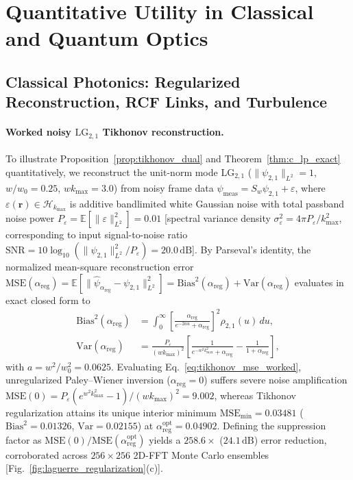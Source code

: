 \documentclass[aps,pra,reprint,amsmath,amssymb,floatfix,longbibliography]{revtex4-2}
\providecommand{\norm}[1]{\lVert#1\rVert}
\begin{document}
\section{Quantitative Utility in Classical and Quantum Optics}
\label{sec:optics_utility}

\subsection{Classical Photonics: Regularized Reconstruction, RCF Links, and Turbulence}
\label{subsec:classical_utility}

\paragraph*{Worked noisy $\mathrm{LG}_{2,1}$ Tikhonov reconstruction.}
To illustrate Proposition~\ref{prop:tikhonov_dual} and Theorem~\ref{thm:c_lp_exact} quantitatively, we reconstruct the unit-norm mode $\mathrm{LG}_{2,1}$ ($\norm{\psi_{2,1}}_{L^2} = 1$, $w/w_0 = 0.25$, $w k_{\max} = 3.0$) from noisy frame data $\psi_{\mathrm{meas}} = S_w\psi_{2,1} + \varepsilon$, where $\varepsilon(\mathbf{r}) \in \mathcal{H}_{k_{\max}}$ is additive bandlimited white Gaussian noise with total passband noise power $P_\varepsilon = \mathbb{E}[\norm{\varepsilon}_{L^2}^2] = 0.01$ [spectral variance density $\sigma_\varepsilon^2 = 4\pi P_\varepsilon/k_{\max}^2$, corresponding to input signal-to-noise ratio $\mathrm{SNR} = 10\log_{10}(\norm{\psi_{2,1}}_{L^2}^2/P_\varepsilon) = 20.0\,\mathrm{dB}$]. By Parseval's identity, the normalized mean-square reconstruction error $\mathrm{MSE}(\alpha_{\mathrm{reg}}) = \mathbb{E}[\norm{\hat{\psi}_{\alpha_{\mathrm{reg}}} - \psi_{2,1}}_{L^2}^2] = \mathrm{Bias}^2(\alpha_{\mathrm{reg}}) + \mathrm{Var}(\alpha_{\mathrm{reg}})$ evaluates in exact closed form to
\begin{align}
\mathrm{Bias}^2(\alpha_{\mathrm{reg}}) &= \int_0^\infty \left[\frac{\alpha_{\mathrm{reg}}}{e^{-2au} + \alpha_{\mathrm{reg}}}\right]^2 \rho_{2,1}(u)\,du, \nonumber \\
\mathrm{Var}(\alpha_{\mathrm{reg}}) &= \frac{P_\varepsilon}{(w k_{\max})^2} \left[\frac{1}{e^{-w^2 k_{\max}^2} + \alpha_{\mathrm{reg}}} - \frac{1}{1 + \alpha_{\mathrm{reg}}}\right],
\label{eq:tikhonov_mse_worked}
\end{align}
with $a = w^2/w_0^2 = 0.0625$. Evaluating Eq.~\eqref{eq:tikhonov_mse_worked}, unregularized Paley--Wiener inversion ($\alpha_{\mathrm{reg}} = 0$) suffers severe noise amplification $\mathrm{MSE}(0) = P_\varepsilon (e^{w^2 k_{\max}^2} - 1)/(w k_{\max})^2 = 9.002$, whereas Tikhonov regularization attains its unique interior minimum $\mathrm{MSE}_{\min} = 0.03481$ ($\mathrm{Bias}^2 = 0.01326$, $\mathrm{Var} = 0.02155$) at $\alpha_{\mathrm{reg}}^{\mathrm{opt}} = 0.04902$. Defining the suppression factor as $\mathrm{MSE}(0)/\mathrm{MSE}(\alpha_{\mathrm{reg}}^{\mathrm{opt}})$ yields a $258.6\times$ ($24.1\,\mathrm{dB}$) error reduction, corroborated across $256\times 256$ 2D-FFT Monte Carlo ensembles [Fig.~\ref{fig:laguerre_regularization}(c)].
\end{document}
